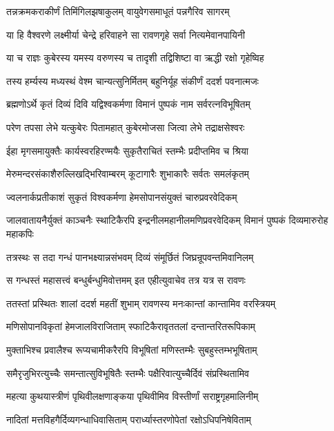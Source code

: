 \twolineshloka
{तन्नक्रमकराकीर्णं तिमिंगिलझषाकुलम्}
{वायुवेगसमाधूतं पन्नगैरिव सागरम्} %

\twolineshloka
{या हि वैश्वरणे लक्ष्मीर्या चेन्द्रे हरिवाहने}
{सा रावणगृहे सर्वा नित्यमेवानपायिनी} %

\twolineshloka
{या च राज्ञः कुबेरस्य यमस्य वरुणस्य च}
{तादृशी तद्विशिष्टा वा ऋद्धी रक्षो गृहेष्विह} %

\twolineshloka
{तस्य हर्म्यस्य मध्यस्थं वेश्म चान्यत्सुनिर्मितम्}
{बहुनिर्यूह संकीर्णं ददर्श पवनात्मजः} %

\twolineshloka
{ब्रह्मणोऽर्थे कृतं दिव्यं दिवि यद्विश्वकर्मणा}
{विमानं पुष्पकं नाम सर्वरत्नविभूषितम्} %

\twolineshloka
{परेण तपसा लेभे यत्कुबेरः पितामहात्}
{कुबेरमोजसा जित्वा लेभे तद्राक्षसेश्वरः} %

\twolineshloka
{ईहा मृगसमायुक्तैः कार्यस्वरहिरण्मयैः}
{सुकृतैराचितं स्तम्भैः प्रदीप्तमिव च श्रिया} %

\twolineshloka
{मेरुमन्दरसंकाशैरुल्लिखद्भिरिवाम्बरम्}
{कूटागारैः शुभाकारैः सर्वतः समलंकृतम्} %

\twolineshloka
{ज्वलनार्कप्रतीकाशं सुकृतं विश्वकर्मणा}
{हेमसोपानसंयुक्तं चारुप्रवरवेदिकम्} %

\threelineshloka
{जालवातायनैर्युक्तं काञ्चनैः स्थाटिकैरपि}
{इन्द्रनीलमहानीलमणिप्रवरवेदिकम्}
{विमानं पुष्पकं दिव्यमारुरोह महाकपिः} %

\twolineshloka
{तत्रस्थः स तदा गन्धं पानभक्ष्यान्नसंभवम्}
{दिव्यं संमूर्छितं जिघ्रन्रूपवन्तमिवानिलम्} %

\twolineshloka
{स गन्धस्तं महासत्त्वं बन्धुर्बन्धुमिवोत्तमम्}
{इत एहीत्युवाचेव तत्र यत्र स रावणः} %

\twolineshloka
{ततस्तां प्रस्थितः शालां ददर्श महतीं शुभाम्}
{रावणस्य मनःकान्तां कान्तामिव वरस्त्रियम्} %

\twolineshloka
{मणिसोपानविकृतां हेमजालविराजिताम्}
{स्फाटिकैरावृततलां दन्तान्तरितरूपिकाम्} %

\twolineshloka
{मुक्ताभिश्च प्रवालैश्च रूप्यचामीकरैरपि}
{विभूषितां मणिस्तम्भैः सुबहुस्तम्भभूषिताम्} %

\twolineshloka
{समैरृजुभिरत्युच्चैः समन्तात्सुविभूषितैः}
{स्तम्भैः पक्षैरिवात्युच्चैर्दिवं संप्रस्थितामिव} %

\twolineshloka
{महत्या कुथयास्त्रीणं पृथिवीलक्षणाङ्कया}
{पृथिवीमिव विस्तीर्णां सराष्ट्रगृहमालिनीम्} %

\twolineshloka
{नादितां मत्तविहगैर्दिव्यगन्धाधिवासिताम्}
{परार्ध्यास्तरणोपेतां रक्षोऽधिपनिषेविताम्} %

